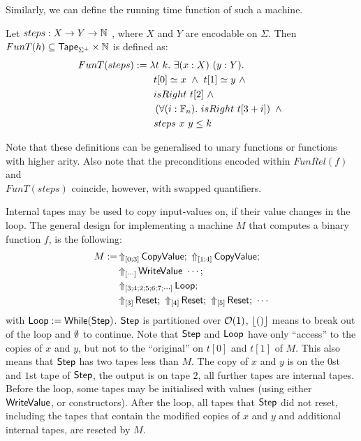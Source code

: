 Similarly, we can define the running time function of such a machine.
\begin{definition}
  \label{def:Computes2_T}
  Let $steps : X \rightarrow Y \rightarrow \mathbb{N}$ , where $X$ and $Y$ are encodable on $\Sigma$.  Then $FunT(h) \subseteq \mathsf{Tape}_{\Sigma^+} \times \mathbb{N}$ is defined as:
  \begin{alignat*}{2}
     FunT(steps) &:= \lambda t~k.~\exists (x:X)~(y:Y). \\
    &\qquad t[0] \simeq x ~\land~ t[1] \simeq y ~\land~ \\
    &\qquad isRight~t[2] ~\land~ \\
    &\qquad \left(\forall (i:\mathbb{F}_n).~isRight~t[3+i] \right) ~\land~ \\
    &\qquad steps~x~y \leq k
  \end{alignat*}
\end{definition}

Note that these definitions can be generalised to unary functions or functions with higher arity.  Also note that the preconditions encoded within
$FunRel(f)$ and \\
$FunT(steps)$ coincide, however, with swapped quantifiers.

Internal tapes may be used to copy input-values on, if their value changes in the loop.  The general design for implementing a machine $M$ that
computes a binary function $f$, is the following:
\begin{align*}
  M := & \LiftTapes{\MS{CopyValue}}{\Vector{0; 3}} \Seq \LiftTapes{\MS{CopyValue}}{\Vector{1; 4}} \Seq \\
       & \LiftTapes{\MS{WriteValue}~\cdots}{\Vector{\cdots}} \Seq \\
       & \LiftTapes{\MS{Loop}}{\Vector{3; 4; 2; 5; 6; 7; \cdots}} \Seq \\
       & \LiftTapes{\MS{Reset}}{\Vector{3}} \Seq \LiftTapes{\MS{Reset}}{\Vector{4}} \Seq \LiftTapes{\MS{Reset}}{\Vector{5}} \Seq \cdots
\end{align*}
with $\mathsf{Loop} := \mathsf{While}(\mathsf{Step})$.  $\mathsf{Step}$ is partitioned over $\mathcal{O}(\mathsf{1})$, $\left\lfloor {\ensuremath{\mathsf{()}}} \right\rfloor$ means to break out of the loop and $\emptyset$ to
continue.  Note that $\mathsf{Step}$ and $\mathsf{Loop}$ have only ``access'' to the copies of $x$ and $y$, but not to the ``original'' on $t[0]$ and $t[1]$
of $M$.  This also means that $\mathsf{Step}$ has two tapes less than $M$.  The copy of $x$ and $y$ is on the $0$st and $1$st tape of $\mathsf{Step}$, the
output is on tape $2$, all further tapes are internal tapes.  Before the loop, some tapes may be initialised with values (using either
$\mathsf{WriteValue}$, or constructors).  After the loop, all tapes that $\mathsf{Step}$ did not reset, including the tapes that contain the modified copies
of $x$ and $y$ and additional internal tapes, are reseted by $M$.

